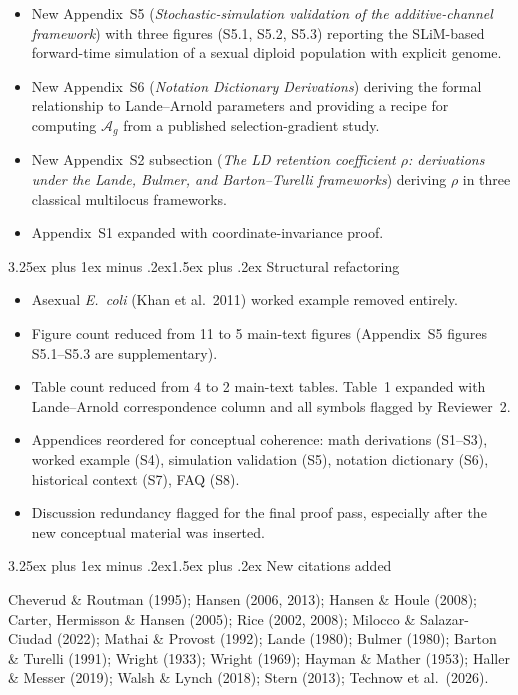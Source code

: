 \documentclass[11pt,a4paper]{article}
\makeatletter
\renewcommand{\subsection}{\@startsection{subsection}{2}{0pt}%
  {3.25ex plus 1ex minus .2ex}{1.5ex plus .2ex}%
  {\large\bfseries}}
\newcommand{\Ag}{\ensuremath{\mathcal{A}_{g}}\xspace}
\makeatother
\begin{document}
\begin{itemize}[leftmargin=*]
\item New Appendix~S5 (\textit{Stochastic-simulation validation of the additive-channel framework}) with three figures (S5.1, S5.2, S5.3) reporting the SLiM-based forward-time simulation of a sexual diploid population with explicit genome.
\item New Appendix~S6 (\textit{Notation Dictionary Derivations}) deriving the formal relationship to Lande--Arnold parameters and providing a recipe for computing $\Ag$ from a published selection-gradient study.
\item New Appendix~S2 subsection (\textit{The LD retention coefficient $\rho$: derivations under the Lande, Bulmer, and Barton--Turelli frameworks}) deriving $\rho$ in three classical multilocus frameworks.
\item Appendix~S1 expanded with coordinate-invariance proof.
\end{itemize}

\subsection{Structural refactoring}

\begin{itemize}[leftmargin=*]
\item Asexual \textit{E.~coli} (Khan et al.\ 2011) worked example removed entirely.
\item Figure count reduced from 11 to 5 main-text figures (Appendix~S5 figures S5.1--S5.3 are supplementary).
\item Table count reduced from 4 to 2 main-text tables. Table~1 expanded with Lande--Arnold correspondence column and all symbols flagged by Reviewer~2.
\item Appendices reordered for conceptual coherence: math derivations (S1--S3), worked example (S4), simulation validation (S5), notation dictionary (S6), historical context (S7), FAQ (S8).
\item Discussion redundancy flagged for the final proof pass, especially after the new conceptual material was inserted.
\end{itemize}

\subsection{New citations added}

Cheverud \& Routman (1995); Hansen (2006, 2013); Hansen \& Houle (2008); Carter, Hermisson \& Hansen (2005); Rice (2002, 2008); Milocco \& Salazar-Ciudad (2022); Mathai \& Provost (1992); Lande (1980); Bulmer (1980); Barton \& Turelli (1991); Wright (1933); Wright (1969); Hayman \& Mather (1953); Haller \& Messer (2019); Walsh \& Lynch (2018); Stern (2013); Technow et al.\ (2026).
\end{document}
